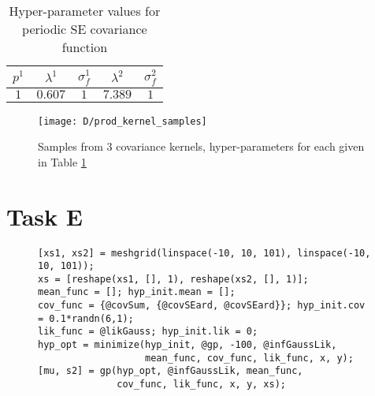 \documentclass[11pt]{article}
\begin{document}
\begin{table}[h]
    \centering
    \small
    \begin{tabular}{|c|c|c|c|c|}
        \hline
        $p^1$ & $\lambda^1$ & $\sigma_f^1$ & $\lambda^2$ & $\sigma_f^2$ \\
        \hline
        $1$ & $0.607$ & $1$ & $7.389$ & $1$ \\
        \hline
    \end{tabular}
    \caption{Hyper-parameter values for periodic SE covariance function}
    \label{table:D_product_covariance_hyper_parameters}
\end{table}

\begin{figure}[h]
    \centering
    \texttt{[image: D/prod\_kernel\_samples]}
    \caption{Samples from 3 covariance kernels, hyper-parameters for each given in Table \ref{table:D_product_covariance_hyper_parameters}}
    \label{fig:D_prod_kernel_samples}
\end{figure}

\section{Task E}

\begin{figure}[h]
\begin{lstlisting}[caption=Code to train and calculate prediction intervals of a 2D GP with SE ARD kernel, captionpos=b, basicstyle=\small, frame=tlrb]
[xs1, xs2] = meshgrid(linspace(-10, 10, 101), linspace(-10, 10, 101));
xs = [reshape(xs1, [], 1), reshape(xs2, [], 1)];
mean_func = []; hyp_init.mean = [];
cov_func = {@covSum, {@covSEard, @covSEard}}; hyp_init.cov = 0.1*randn(6,1);
lik_func = @likGauss; hyp_init.lik = 0;
hyp_opt = minimize(hyp_init, @gp, -100, @infGaussLik, 
                   mean_func, cov_func, lik_func, x, y);
[mu, s2] = gp(hyp_opt, @infGaussLik, mean_func, 
              cov_func, lik_func, x, y, xs);
\end{lstlisting}
\label{lst:E}
\end{figure}
\end{document}
